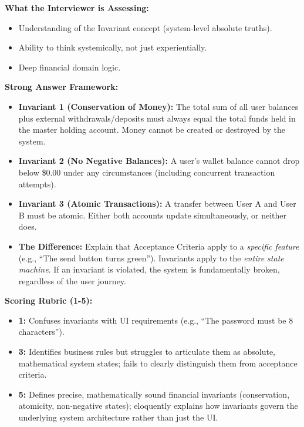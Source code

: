 \documentclass[
  11pt,
  openany,
  oneside]{book}
\providecommand{\tightlist}{%
  \setlength{\itemsep}{0pt}\setlength{\parskip}{0pt}}
\begin{document}
\textbf{What the Interviewer is Assessing:}

\begin{itemize}
\tightlist
\item
  Understanding of the Invariant concept (system-level absolute truths).
\item
  Ability to think systemically, not just experientially.
\item
  Deep financial domain logic.
\end{itemize}

\textbf{Strong Answer Framework:}

\begin{itemize}
\tightlist
\item
  \textbf{Invariant 1 (Conservation of Money):} The total sum of all
  user balances plus external withdrawals/deposits must always equal the
  total funds held in the master holding account. Money cannot be
  created or destroyed by the system.
\item
  \textbf{Invariant 2 (No Negative Balances):} A user's wallet balance
  cannot drop below \$0.00 under any circumstances (including concurrent
  transaction attempts).
\item
  \textbf{Invariant 3 (Atomic Transactions):} A transfer between User A
  and User B must be atomic. Either both accounts update simultaneously,
  or neither does.
\item
  \textbf{The Difference:} Explain that Acceptance Criteria apply to a
  \emph{specific feature} (e.g., ``The send button turns green'').
  Invariants apply to the \emph{entire state machine}. If an invariant
  is violated, the system is fundamentally broken, regardless of the
  user journey.
\end{itemize}

\textbf{Scoring Rubric (1-5):}

\begin{itemize}
\tightlist
\item
  \textbf{1:} Confuses invariants with UI requirements (e.g., ``The
  password must be 8 characters'').
\item
  \textbf{3:} Identifies business rules but struggles to articulate them
  as absolute, mathematical system states; fails to clearly distinguish
  them from acceptance criteria.
\item
  \textbf{5:} Defines precise, mathematically sound financial invariants
  (conservation, atomicity, non-negative states); eloquently explains
  how invariants govern the underlying system architecture rather than
  just the UI.
\end{itemize}
\end{document}
